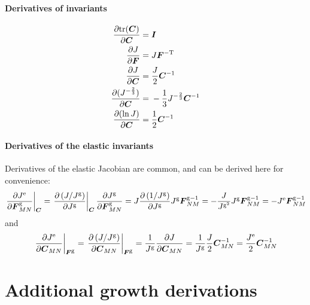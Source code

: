\documentclass[10pt,letterpaper,oneside]{report}
\newcommand{\ten}[1]{\mbox{\boldmath $#1$}{}}
\newcommand{\scas}[1]{\mbox{{\scriptsize{${\rm{#1}}$}}}{}}
\newcommand{\tens}[1]{\mbox{\boldmath{\scriptsize{$#1$}}}{}}
\begin{document}
\paragraph{Derivatives of invariants}
\begin{align}
\frac{\partial \text{tr} (\ten{C}) }{\partial \ten{C} } ={}& \ten{I} 
\\
\frac{\partial J}{\partial \ten{F}} ={}& J \ten{F}^{-\scas{T}} 
\\
\frac{\partial J}{\partial \ten{C}} ={}& \frac{J}{2} \ten{C}^{-1} 
\\
\frac{\partial (J^{-\frac{2}{3}}) }{\partial \ten{C}} ={}& -\frac{1}{3} J^{-\frac{2}{3}} \ten{C}^{-1} 
\\
\frac{\partial (\ln J) }{\partial \ten{C}} ={}& \frac{1}{2} \ten{C}^{-1}
\label{dlnJ/dC}
\end{align}

\paragraph{Derivatives of the elastic invariants}
Derivatives of the elastic Jacobian are common, and can be derived here for convenience: 
\begin{equation}
\left. \frac{ \partial J^{\scas{e}} }{ \partial \ten{F}^{\scas{g}}_{MN} } \right|_{\tens{C}}
= \left. \frac{ \partial \left( J / J^{\scas{g}} \right) }{ \partial J^{\scas{g}} } \right|_{\tens{C}} \frac{ \partial J^{\scas{g}} }{ \partial \ten{F}^{\scas{g}}_{MN} }
= J \frac{ \partial \left( 1 / J^{\scas{g}} \right) }{ \partial J^{\scas{g}} } J^{\scas{g}} \ten{F}^{\scas{g}-1}_{NM}
= - \frac{ J }{J^{\scas{g}^2}} J^{\scas{g}} \ten{F}^{\scas{g}-1}_{NM}
= - J^{\scas{e}} \ten{F}^{\scas{g}-1}_{NM}
\label{dJe/dFg}
\end{equation}
and
\begin{equation}
\left. \frac{ \partial J^{\scas{e}} }{ \partial \ten{C}_{MN} } \right|_{\tens{F}^{\scas{g}}}
= \left. \frac{ \partial \left( J / J^{\scas{g}} \right) }{ \partial \ten{C}_{MN} } \right|_{\tens{F}^{\scas{g}}}
= \frac{1}{ J^{\scas{g}} } \frac{ \partial J }{ \partial \ten{C}_{MN} } 
= \frac{1}{ J^{\scas{g}} } \frac{J}{2} \ten{C}^{-1}_{MN}
= \frac{J^{\scas{e}}}{2} \ten{C}^{-1}_{MN}
\label{dJe/dC}
\end{equation}


\section{Additional growth derivations}
\end{document}
